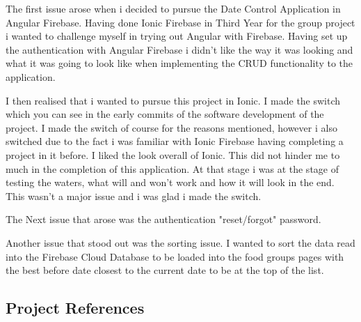 The first issue arose when i decided to pursue the Date Control Application in Angular Firebase. Having done Ionic Firebase in Third Year for the group project i wanted to challenge myself in trying out Angular with Firebase. Having set up the authentication with Angular Firebase i didn't like the way it was looking and what it was going to look like when implementing the CRUD functionality to the application.
\newline

I then realised that i wanted to pursue this project in Ionic. I made the switch which you can see in the early commits of the software development of the project. I made the switch of course for the reasons mentioned, however i also switched due to the fact i was familiar with Ionic Firebase having completing a project in it before. I liked the look overall of Ionic. This did not hinder me to much in the completion of this application. At that stage i was at the stage of testing the waters, what will and won't work and how it will look in the end. This wasn't a major issue and i was glad i made the switch. 
\newline

The Next issue that arose was the authentication "reset/forgot" password. %
\newline

Another issue that stood out was the sorting issue. I wanted to sort the data read into the Firebase Cloud Database to be loaded into the food groups pages with the best before date closest to the current date to be at the top of the list. %

\subsection{Project References}
